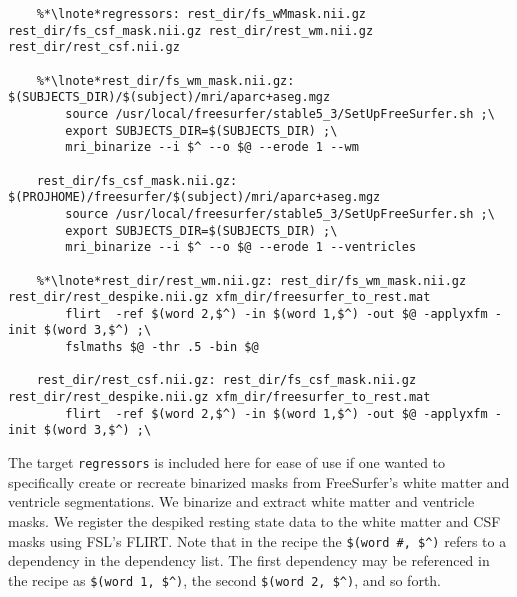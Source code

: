 \begin{lstlisting}
	%*\lnote*regressors: rest_dir/fs_wMmask.nii.gz rest_dir/fs_csf_mask.nii.gz rest_dir/rest_wm.nii.gz rest_dir/rest_csf.nii.gz

	%*\lnote*rest_dir/fs_wm_mask.nii.gz: $(SUBJECTS_DIR)/$(subject)/mri/aparc+aseg.mgz
		source /usr/local/freesurfer/stable5_3/SetUpFreeSurfer.sh ;\
		export SUBJECTS_DIR=$(SUBJECTS_DIR) ;\
		mri_binarize --i $^ --o $@ --erode 1 --wm

	rest_dir/fs_csf_mask.nii.gz: $(PROJHOME)/freesurfer/$(subject)/mri/aparc+aseg.mgz
		source /usr/local/freesurfer/stable5_3/SetUpFreeSurfer.sh ;\
		export SUBJECTS_DIR=$(SUBJECTS_DIR) ;\
		mri_binarize --i $^ --o $@ --erode 1 --ventricles
		
	%*\lnote*rest_dir/rest_wm.nii.gz: rest_dir/fs_wm_mask.nii.gz rest_dir/rest_despike.nii.gz xfm_dir/freesurfer_to_rest.mat
		flirt  -ref $(word 2,$^) -in $(word 1,$^) -out $@ -applyxfm -init $(word 3,$^) ;\	
		fslmaths $@ -thr .5 -bin $@

	rest_dir/rest_csf.nii.gz: rest_dir/fs_csf_mask.nii.gz rest_dir/rest_despike.nii.gz xfm_dir/freesurfer_to_rest.mat
		flirt  -ref $(word 2,$^) -in $(word 1,$^) -out $@ -applyxfm -init $(word 3,$^) ;\
\end{lstlisting}

\lnum{14} The target \texttt{regressors} is included here for ease of use if one wanted to specifically create or recreate binarized masks from FreeSurfer's white matter and ventricle segmentations.  We binarize and extract white matter and ventricle masks.  We register the despiked resting state data to the white matter and CSF masks using  FSL's FLIRT.  Note that in the recipe the \texttt{\$(word \#, \$\^{})} refers to a dependency in the dependency list. The first dependency may be referenced in the recipe as \texttt{\$(word 1, \$\^{})}, the second \texttt{\$(word 2, \$\^{})}, and so forth.

